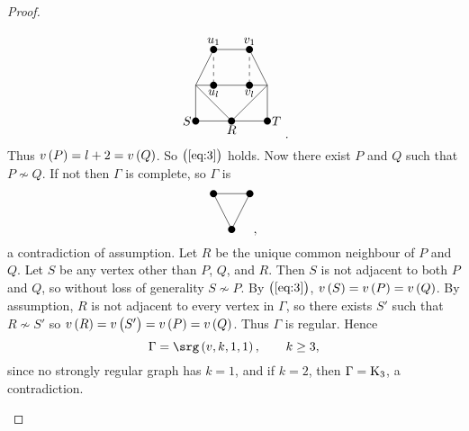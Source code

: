 \begin{proof}
\begin{enumerate}[leftmargin=0.5in, label=Step \arabic*.]
$$\begin{tikzpicture}
\fill (0, -1) circle (0.1) node[left]{$ S $};
\fill (1, -1) circle (0.1) node[below]{$ R $};
\fill (2, -1) circle (0.1) node[right]{$ T $};
\fill (0.5, 1) circle (0.1) node[above]{$ u_1 $};
\fill (0.5, 0) circle (0.1) node[below]{$ u_l $};
\fill (1.5, 1) circle (0.1) node[above]{$ v_1 $};
\fill (1.5, 0) circle (0.1) node[below]{$ v_l $};
\draw (0, 0) to (1, -1);
\draw (2, 0) to (1, -1);
\draw (0, 0) to (0, -1);
\draw (1, -1) to (0, -1);
\draw (2, 0) to (2, -1);
\draw (1, -1) to (2, -1);
\draw (0, 0) to (0.5, 1);
\draw (0, 0) to (0.5, 0);
\draw [dashed] (0.5, 1) to (0.5, 0);
\draw (2, 0) to (1.5, 1);
\draw (2, 0) to (1.5, 0);
\draw [dashed] (1.5, 1) to (1.5, 0);
\draw (0.5, 1) to (1.5, 1);
\draw (0.5, 0) to (1.5, 0);
\end{tikzpicture}.
$$
Thus $ v\br{P} = l + 2 = v\br{Q} $. So $ \br{\ref{eq:3}} $ holds. Now there exist $ P $ and $ Q $ such that $ P \nsim Q $. If not then $ \Gamma $ is complete, so $ \Gamma $ is
$$
\begin{tikzpicture}
\fill (0, 0) circle (0.1);
\fill (1, 0) circle (0.1);
\fill (0.5, -1) circle (0.1);
\draw (0, 0) to (1, 0);
\draw (0, 0) to (0.5, -1);
\draw (1, 0) to (0.5, -1);
\end{tikzpicture},
$$
a contradiction of assumption. Let $ R $ be the unique common neighbour of $ P $ and $ Q $. Let $ S $ be any vertex other than $ P $, $ Q $, and $ R $. Then $ S $ is not adjacent to both $ P $ and $ Q $, so without loss of generality $ S \nsim P $. By $ \br{\ref{eq:3}} $, $ v\br{S} = v\br{P} = v\br{Q} $. By assumption, $ R $ is not adjacent to every vertex in $ \Gamma $, so there exists $ S' $ such that $ R \nsim S' $ so $ v\br{R} = v\br{S'} = v\br{P} = v\br{Q} $. Thus $ \Gamma $ is regular. Hence
$$ \Gamma = \srg\br{v, k, 1, 1}, \qquad k \ge 3, $$
since no strongly regular graph has $ k = 1 $, and if $ k = 2 $, then $ \Gamma = \mathrm{K}_3 $, a contradiction.

\pagebreak


\end{enumerate}
\end{proof}

